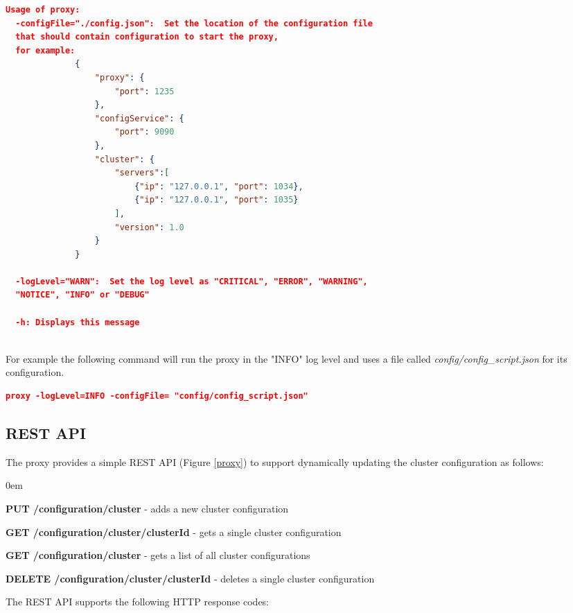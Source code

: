\documentclass[a4paper,11pt,twoside]{article}
\begin{document}
\begin{lstlisting}[language=json,firstnumber=1]
Usage of proxy:
  -configFile="./config.json":  Set the location of the configuration file 
  that should contain configuration to start the proxy, 
  for example:
              {
                  "proxy": {
                      "port": 1235
                  },
                  "configService": {
                      "port": 9090
                  },
                  "cluster": {
                      "servers":[
                          {"ip": "127.0.0.1", "port": 1034},
                          {"ip": "127.0.0.1", "port": 1035}
                      ],
                      "version": 1.0
                  }
              }

  -logLevel="WARN":  Set the log level as "CRITICAL", "ERROR", "WARNING", 
  "NOTICE", "INFO" or "DEBUG"

  -h: Displays this message
\end{lstlisting} 

\noindent\\
For example the following command will run the proxy in the "INFO" log level and uses a file called \textit{config/config\_script.json} for its configuration. 

\begin{lstlisting}[language=json,firstnumber=1]
proxy -logLevel=INFO -configFile= "config/config_script.json" 
\end{lstlisting}
 
\subsection{REST API}
The proxy provides a simple REST API (Figure \ref{proxy}) to support dynamically updating the cluster configuration as follows:\\

\begin{list}{-}{}
  \itemsep0em
  \item\textbf{{PUT /configuration/cluster}} - adds a new cluster configuration
  
  \item\textbf{{GET /configuration/cluster/{clusterId}}} -  gets a single cluster configuration
  
   \item\textbf{{GET /configuration/cluster}} - gets a list of all cluster configurations
   
   \item\textbf{{DELETE /configuration/cluster/{clusterId}}} -  deletes a single cluster configuration
  
\end{list}
\noindent
The REST API supports the following HTTP response codes:
\end{document}
